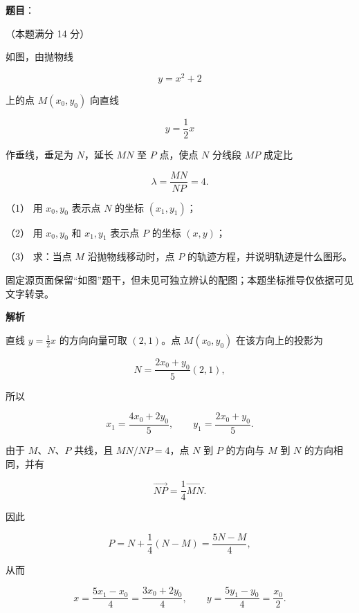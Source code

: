 \begin{answer}

\textbf{题目}：

（本题满分 14 分）

如图，由抛物线

\nopagebreak[4]
\[
y=x^2+2
\]

上的点 $M(x_0,y_0)$ 向直线

\nopagebreak[4]
\[
y=\frac12x
\]

作垂线，垂足为 $N$，延长 $MN$ 至 $P$ 点，使点 $N$ 分线段 $MP$ 成定比

\nopagebreak[4]
\[
\lambda=\frac{MN}{NP}=4.
\]

（1） 用 $x_0,y_0$ 表示点 $N$ 的坐标 $(x_1,y_1)$；

（2） 用 $x_0,y_0$ 和 $x_1,y_1$ 表示点 $P$ 的坐标 $(x,y)$；

（3） 求：当点 $M$ 沿抛物线移动时，点 $P$ 的轨迹方程，并说明轨迹是什么图形。

\begin{gktip}
固定源页面保留“如图”题干，但未见可独立辨认的配图；本题坐标推导仅依据可见文字转录。
\end{gktip}

\textbf{解析}


直线 $y=\frac12x$ 的方向向量可取 $(2,1)$。点
$M(x_0,y_0)$ 在该方向上的投影为

\nopagebreak[4]
\[
N=\frac{2x_0+y_0}{5}(2,1),
\]

所以

\nopagebreak[4]
\[
x_1=\frac{4x_0+2y_0}{5},
\qquad
y_1=\frac{2x_0+y_0}{5}.
\]


由于 $M\text{、}N\text{、}P$ 共线，且 $MN/NP=4$，点 $N$ 到 $P$ 的方向与
$M$ 到 $N$ 的方向相同，并有

\nopagebreak[4]
\[
\overrightarrow{NP}=\frac14\overrightarrow{MN}.
\]

因此

\nopagebreak[4]
\[
P=N+\frac14(N-M)=\frac{5N-M}{4},
\]

从而

\nopagebreak[4]
\[
x=\frac{5x_1-x_0}{4}=\frac{3x_0+2y_0}{4},
\qquad
y=\frac{5y_1-y_0}{4}=\frac{x_0}{2}.
\]


\end{answer}
